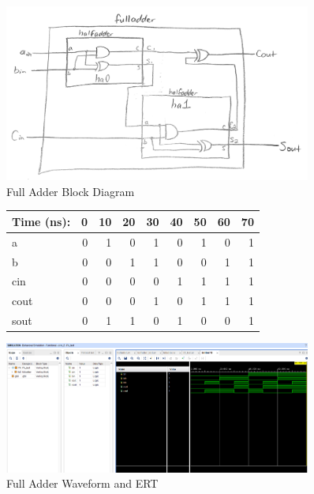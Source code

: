 \documentclass[11pt]{article}
\begin{document}
\medskip
\medskip

\begin{figure}
	\includegraphics[width=0.9\textwidth]{FA_block}
	\caption{Full Adder Block Diagram}
	\label{fig:fa_block}
\end{figure}
\medskip

\begin{figure}[ht]\centering
	\begin{tabular}{l|rrrrrrrr}
		Time (ns): & 0 & 10 & 20 & 30 & 40 & 50 & 60 & 70\\
		\midrule
		a & 0 & 1 & 0 & 1 & 0 & 1 & 0 & 1\\
		b & 0 & 0 & 1 & 1 & 0 & 0 & 1 & 1\\
		cin & 0 & 0 & 0 & 0 & 1 & 1 & 1 & 1\\ 
		\midrule
		cout & 0 & 0 & 0 & 1 & 0 & 1 & 1 & 1 \\
		sout & 0 & 1 & 1 & 0 & 1 & 0 & 0 & 1\\
		\bottomrule
	\end{tabular}\medskip
	
	\includegraphics[width=0.9\textwidth,trim = 8.5cm 11cm 0cm 2.5cm,clip]{FA_snip}
	\caption{Full Adder Waveform and ERT}
	\label{fig:fa_ert}
\end{figure}

\medskip
\medskip
\end{document}
